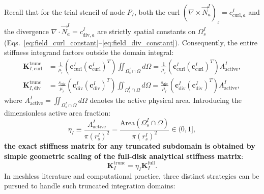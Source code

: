 \documentclass[VANCOUVER,Times1COL]{WileyNJD-v5}
\begin{document}
Recall that for the trial stencil of node $P_I$, both the curl $(\nabla \times \vec{N}_a^I)_z = c_{\mathrm{curl}, a}^I$ and the divergence $\nabla \cdot \vec{N}_a^I = c_{\mathrm{div}, a}^I$ are strictly spatial constants on $\Omega_s^I$ (Eqs.~\eqref{eq:field_curl_constant}--\eqref{eq:field_div_constant}). Consequently, the entire stiffness integrand factors outside the domain integral:
\begin{align}
    \mathbf{K}_{I, \mathrm{curl}}^{\mathrm{trunc}} & = \frac{1}{\mu_r} \left( \mathbf{c}_{\mathrm{curl}}^I (\mathbf{c}_{\mathrm{curl}}^I)^T \right) \iint_{\Omega_s^I \cap \Omega} d\Omega = \frac{1}{\mu_r} \left( \mathbf{c}_{\mathrm{curl}}^I (\mathbf{c}_{\mathrm{curl}}^I)^T \right) A_{\mathrm{active}}^I, \label{eq:k_curl_truncated}                          \\
    \mathbf{K}_{I, \mathrm{div}}^{\mathrm{trunc}}  & = \frac{s_{\mathrm{div}}}{\mu_r} \left( \mathbf{c}_{\mathrm{div}}^I (\mathbf{c}_{\mathrm{div}}^I)^T \right) \iint_{\Omega_s^I \cap \Omega} d\Omega = \frac{s_{\mathrm{div}}}{\mu_r} \left( \mathbf{c}_{\mathrm{div}}^I (\mathbf{c}_{\mathrm{div}}^I)^T \right) A_{\mathrm{active}}^I, \label{eq:k_div_truncated}
\end{align}
where $A_{\mathrm{active}}^I = \iint_{\Omega_s^I \cap \Omega} d\Omega$ denotes the active physical area. Introducing the dimensionless active area fraction:
\begin{equation}
    \eta_I \equiv \frac{A_{\mathrm{active}}^I}{\pi (r_s^I)^2} = \frac{\mathrm{Area}(\Omega_s^I \cap \Omega)}{\pi (r_s^I)^2} \in (0, 1],
    \label{eq:area_fraction_eta}
\end{equation}
\textbf{the exact stiffness matrix for any truncated subdomain is obtained by simple geometric scaling of the full-disk analytical stiffness matrix}:
\begin{equation}
    \mathbf{K}_I^{\mathrm{trunc}} = \eta_I \mathbf{K}_I^{\mathrm{full}}.
    \label{eq:k_truncated_scaled}
\end{equation}
In meshless literature and computational practice, three distinct strategies can be pursued to handle such truncated integration domains:
\end{document}
